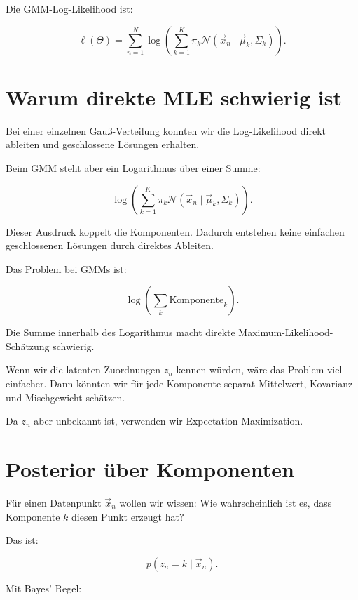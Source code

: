 \begin{definitionbox}
Die GMM-Log-Likelihood ist:

\[
    \ell(\Theta)
    =
    \sum_{n=1}^{N}
    \log
    \left(
        \sum_{k=1}^{K}
        \pi_k
        \mathcal{N}(\vec{x}_n\mid\vec{\mu}_k,\Sigma_k)
    \right).
\]
\end{definitionbox}

\section{Warum direkte MLE schwierig ist}

Bei einer einzelnen Gauß-Verteilung konnten wir die Log-Likelihood direkt ableiten und geschlossene Lösungen erhalten.

Beim GMM steht aber ein Logarithmus über einer Summe:

\[
    \log
    \left(
        \sum_{k=1}^{K}
        \pi_k
        \mathcal{N}(\vec{x}_n\mid\vec{\mu}_k,\Sigma_k)
    \right).
\]

Dieser Ausdruck koppelt die Komponenten.
Dadurch entstehen keine einfachen geschlossenen Lösungen durch direktes Ableiten.

\begin{conceptbox}
Das Problem bei GMMs ist:

\[
    \log
    \left(
        \sum_k
        \text{Komponente}_k
    \right).
\]

Die Summe innerhalb des Logarithmus macht direkte Maximum-Likelihood-Schätzung schwierig.
\end{conceptbox}

Wenn wir die latenten Zuordnungen \(z_n\) kennen würden, wäre das Problem viel einfacher.
Dann könnten wir für jede Komponente separat Mittelwert, Kovarianz und Mischgewicht schätzen.

Da \(z_n\) aber unbekannt ist, verwenden wir Expectation-Maximization.

\section{Posterior über Komponenten}

Für einen Datenpunkt \(\vec{x}_n\) wollen wir wissen:
Wie wahrscheinlich ist es, dass Komponente \(k\) diesen Punkt erzeugt hat?

Das ist:

\[
    p(z_n=k\mid\vec{x}_n).
\]

Mit Bayes' Regel:

